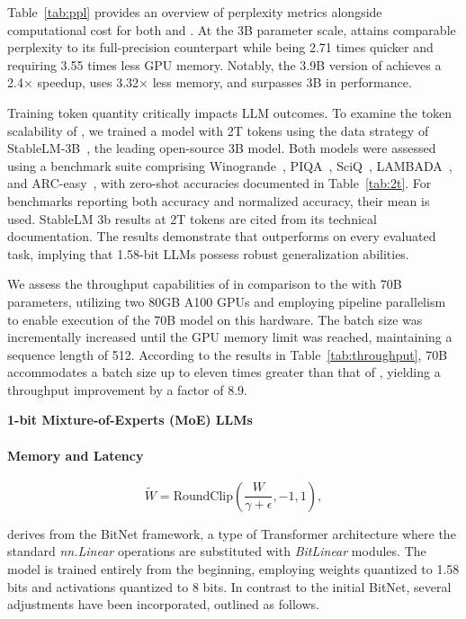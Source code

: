 Table~\ref{tab:ppl} provides an overview of perplexity metrics alongside computational cost for both  and . At the 3B parameter scale,  attains comparable perplexity to its full-precision  counterpart while being 2.71 times quicker and requiring 3.55 times less GPU memory. Notably, the 3.9B version of  achieves a 2.4$\times$ speedup, uses 3.32$\times$ less memory, and surpasses  3B in performance.

Training token quantity critically impacts LLM outcomes. To examine the token scalability of , we trained a model with 2T tokens using the data strategy of StableLM-3B~\cite{StableLM-3B-4E1T}, the leading open-source 3B model. Both models were assessed using a benchmark suite comprising Winogrande~\cite{winoGrande}, PIQA~\cite{piqa}, SciQ~\cite{sciq}, LAMBADA~\cite{lambada}, and ARC-easy~\cite{arc}, with zero-shot accuracies documented in Table~\ref{tab:2t}. For benchmarks reporting both accuracy and normalized accuracy, their mean is used. StableLM 3b results at 2T tokens are cited from its technical documentation. The results demonstrate that  outperforms on every evaluated task, implying that 1.58-bit LLMs possess robust generalization abilities.

We assess the throughput capabilities of  in comparison to the  with 70B parameters, utilizing two 80GB A100 GPUs and employing pipeline parallelism~\cite{gpipe} to enable execution of the  70B model on this hardware. The batch size was incrementally increased until the GPU memory limit was reached, maintaining a sequence length of 512. According to the results in Table~\ref{tab:throughput},  70B accommodates a batch size up to eleven times greater than that of , yielding a throughput improvement by a factor of 8.9.

\textbf{1-bit Mixture-of-Experts (MoE) LLMs}

\paragraph{Memory and Latency}

\begin{equation}
    \widetilde{W} = \mathrm{RoundClip}(\frac{W}{\gamma + \epsilon}, -1, 1),
\end{equation}

 derives from the BitNet framework, a type of Transformer architecture where the standard \emph{nn.Linear} operations are substituted with \emph{BitLinear} modules. The model is trained entirely from the beginning, employing weights quantized to 1.58 bits and activations quantized to 8 bits. In contrast to the initial BitNet, several adjustments have been incorporated, outlined as follows.

